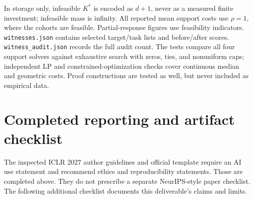 \documentclass{article}
\begin{document}
In storage only, infeasible $K^*$ is encoded as $d+1$, never as a measured finite
investment; infeasible mass is infinity. All reported mean support costs use
$\rho=1$, where the cohorts are feasible. Partial-response figures use feasibility
indicators. \texttt{witnesses.json} contains selected target/task lists and
before/after scores. \texttt{witness\_audit.json} records the full audit count.
The tests compare all four support solvers against exhaustive search with zeros,
ties, and nonuniform caps; independent LP and constrained-optimization checks
cover continuous median and geometric costs. Proof constructions are tested as
well, but never included as empirical data.

\section{Completed reporting and artifact checklist}
\label{app:checklist}
The inspected ICLR 2027 author guidelines and official template require an AI use
statement and recommend ethics and reproducibility statements. Those are completed
above. They do not prescribe a separate NeurIPS-style paper checklist. The following
additional checklist documents this deliverable's claims and limits.
\end{document}
